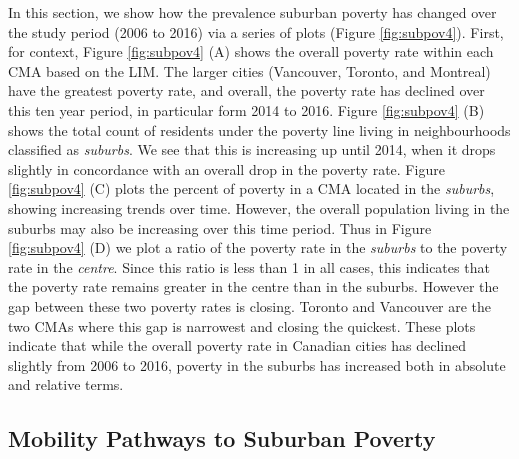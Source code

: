In this section, we show how the prevalence suburban poverty has changed over the study period (2006 to 2016) via a series of plots (Figure \ref{fig:subpov4}). First, for context, Figure \ref{fig:subpov4} (A) shows the overall poverty rate within each CMA based on the LIM. The larger cities (Vancouver, Toronto, and Montreal) have the greatest poverty rate, and overall, the poverty rate has declined over this ten year period, in particular form 2014 to 2016. Figure \ref{fig:subpov4} (B) shows the total count of residents under the poverty line living in neighbourhoods classified as \textit{suburbs}. We see that this is increasing up until 2014, when it drops slightly in concordance with an overall drop in the poverty rate. Figure \ref{fig:subpov4} (C) plots the percent of poverty in a CMA located in the \textit{suburbs}, showing increasing trends over time. However, the overall population living in the suburbs may also be increasing over this time period. Thus in Figure \ref{fig:subpov4} (D) we plot a ratio of the poverty rate in the \textit{suburbs} to the poverty rate in the \textit{centre}. Since this ratio is less than 1 in all cases, this indicates that the poverty rate remains greater in the centre than in the suburbs. However the gap between these two poverty rates is closing. Toronto and Vancouver are the two CMAs where this gap is narrowest and closing the quickest. These plots indicate that while the overall poverty rate in Canadian cities has declined slightly from 2006 to 2016, poverty in the suburbs has increased both in absolute and relative terms.






\subsection{Mobility Pathways to Suburban Poverty}

